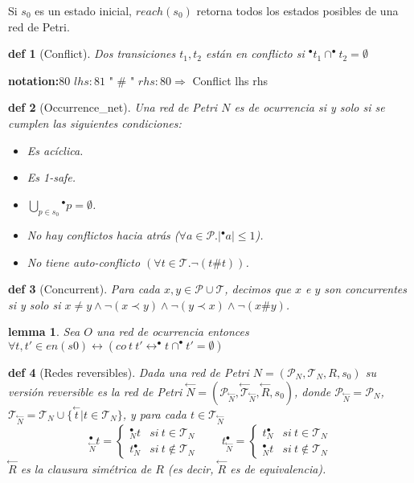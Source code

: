 \documentclass{article}
\newtheorem{defi}{def}
\newtheorem{lem}{lemma}
\newcommand{\Tr}{\mathcal{T}}
\newcommand{\Pl}{\mathcal{P}}
\newcommand{\rev}[1]{\overset{\leftarrow}{#1}}
\begin{document}
Si $s_0$ es un estado inicial, $reach(s_0)$ retorna todos los estados posibles de una red de Petri.

\begin{defi}[Conflict]\rm{Dos transiciones $t_1,t_2$ están en conflicto si } $ ^{\bullet}t_1\cap ^{\bullet}t_2=\emptyset$
\end{defi}

\textbf{notation:}80 $lhs:81$ " \# "  $rhs:80\Rightarrow$ Conflict lhs rhs

\begin{defi}[Occurrence\_net]\rm{Una red de Petri $N$ es de ocurrencia si y solo si se cumplen las siguientes condiciones:} 
\begin{itemize}
	\item Es acíclica. 
	\item Es 1-safe. 
	\item $\displaystyle\bigcup_{p\in s_0}{^{\bullet}p}=\emptyset$.
	\item No hay conflictos hacia atrás ($\forall a\in \Pl. |^{\bullet} a|\le 1$). 
	\item No tiene auto-conflicto $(\forall t\in \Tr.\neg (t\# t))$.
\end{itemize}
\end{defi}

\begin{defi}[Concurrent] \rm{Para cada $x,y\in \Pl\cup \Tr$, decimos que $x$ e $y$ son concurrentes si y solo si $ x\neq y\wedge \neg (x\prec y) \wedge \neg(y\prec x) \wedge \neg(x\# y)$}.
\end{defi}


\begin{lem} Sea $O$ una red de ocurrencia entonces $\forall t,t'\in en(s0) \leftrightarrow (co \ t \ t' \leftrightarrow ^{\bullet}t\cap ^{\bullet}t'=\emptyset)$
\end{lem}

\begin{defi}[Redes reversibles]
\rm{Dada una red de Petri $N=(\Pl_{N},\Tr_N,R,s_0)$ su versión reversible es la red de Petri $\overset{\leftarrow}{N}=(\Pl_{\rev{N}},\rev{\Tr}_{\rev{N}},\rev{R},s_0)$, donde $\Pl_{\rev{N}}=\Pl_N$, $\Tr_{\rev{N}}=\Tr_N\cup\{\rev{t}|t\in \Tr_N\}$, y para cada $t\in \Tr_{\rev{N}}$ 
$$^{\bullet}_{\rev{N}} t=\begin{cases}^{\bullet}_N t & si \ t\in \Tr_N \\ t^{\bullet}_N & si \ t\notin \Tr_N\end{cases} \qquad  t^{\bullet}_{\rev{N}}=\begin{cases} t^{\bullet}_N & si \ t\in \Tr_N \\ ^{\bullet}_Nt & si \ t\notin \Tr_N\end{cases}$$ 
$\rev{R}$ es la clausura simétrica de $R$ (es decir, $\rev{R}$ es de equivalencia).}
\end{defi}
\end{document}
